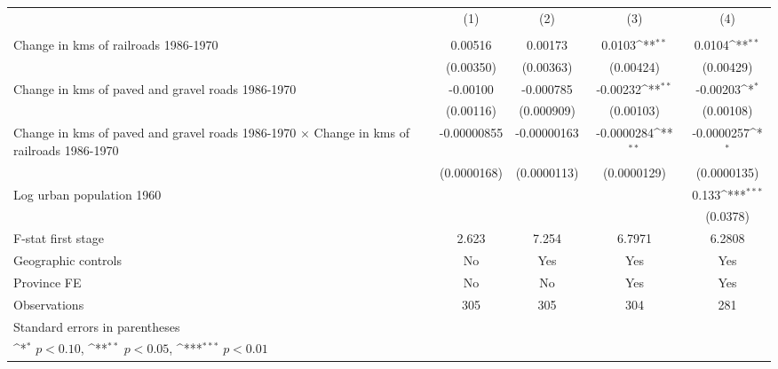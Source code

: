 {
\def\sym#1{\ifmmode^{#1}\else\(^{#1}\)\fi}
\begin{tabular}{l*{4}{c}}
\hline\hline
                &\multicolumn{1}{c}{(1)}&\multicolumn{1}{c}{(2)}&\multicolumn{1}{c}{(3)}&\multicolumn{1}{c}{(4)}\\
                &\multicolumn{1}{c}{}&\multicolumn{1}{c}{}&\multicolumn{1}{c}{}&\multicolumn{1}{c}{}\\
\hline
Change in kms of railroads 1986-1970&  0.00516         &  0.00173         &   0.0103\sym{**} &   0.0104\sym{**} \\
                &(0.00350)         &(0.00363)         &(0.00424)         &(0.00429)         \\
[1em]
Change in kms of paved and gravel roads 1986-1970& -0.00100         &-0.000785         & -0.00232\sym{**} & -0.00203\sym{*}  \\
                &(0.00116)         &(0.000909)         &(0.00103)         &(0.00108)         \\
[1em]
Change in kms of paved and gravel roads 1986-1970 $\times$ Change in kms of railroads 1986-1970&-0.00000855         &-0.00000163         &-0.0000284\sym{**} &-0.0000257\sym{*}  \\
                &(0.0000168)         &(0.0000113)         &(0.0000129)         &(0.0000135)         \\
[1em]
Log urban population 1960&                  &                  &                  &    0.133\sym{***}\\
                &                  &                  &                  & (0.0378)         \\
\hline
F-stat first stage&    2.623         &    7.254         &   6.7971         &   6.2808         \\
Geographic controls&       No         &      Yes         &      Yes         &      Yes         \\
Province FE     &       No         &       No         &      Yes         &      Yes         \\
Observations    &      305         &      305         &      304         &      281         \\
\hline\hline
\multicolumn{5}{l}{\footnotesize Standard errors in parentheses}\\
\multicolumn{5}{l}{\footnotesize \sym{*} \(p<0.10\), \sym{**} \(p<0.05\), \sym{***} \(p<0.01\)}\\
\end{tabular}
}
